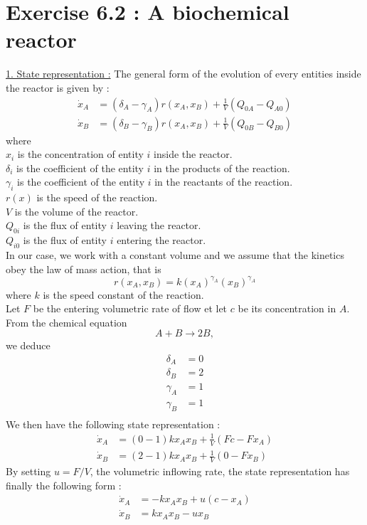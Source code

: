 \section*{Exercise 6.2 : A biochemical reactor}
\underline{1. State representation :}
The general form of the evolution of every entities inside the reactor is given by :
\begin{align*}
\dot{x}_A & = (\delta_A-\gamma_A)r(x_A,x_B)+\frac{1}{V}(Q_{0A}-Q_{A0})\\
\dot{x}_B & = (\delta_B-\gamma_B)r(x_A,x_B)+\frac{1}{V}(Q_{0B}-Q_{B0})
\end{align*}
where\\
$x_i$ is the concentration of entity $i$ inside the reactor.\\
$\delta_i$ is the coefficient of the entity $i$ in the products of the reaction.\\
$\gamma_i$ is the coefficient of the entity $i$ in the reactants of the reaction.\\
$r(x)$ is the speed of the reaction.\\
$V$ is the volume of the reactor.\\
$Q_{0i}$ is the flux of entity $i$ leaving the reactor.\\
$Q_{i0}$ is the flux of entity $i$ entering the reactor.\\
In our case, we work with a constant volume and we assume that the kinetics  obey the law of mass action, that is $$r(x_A,x_B) = k (x_A)^{\gamma_A} (x_B)^{\gamma_A}$$ where $k$ is the speed constant of the reaction.\\
Let $F$ be the entering volumetric rate of flow et let $c$ be its concentration in $A$.\\
From the chemical equation $$A+B \longrightarrow 2B,$$ we deduce
\begin{align*}
\delta_A & = 0\\
\delta_B & = 2\\
\gamma_A & = 1\\
\gamma_B & = 1\\
\end{align*}
We then have the following state representation :
\begin{align*}
\dot{x}_A & = (0-1)k x_A x_B+\frac{1}{V}(Fc-Fx_A)\\
\dot{x}_B & = (2-1)k x_A x_B+\frac{1}{V}(0-Fx_B)
\end{align*}
By setting $u = F/V$, the volumetric inflowing rate, the state representation has finally the following form :
\begin{align*}
\dot{x}_A & = -k x_A x_B+u(c-x_A)\\
\dot{x}_B & = k x_A x_B-ux_B
\end{align*}

